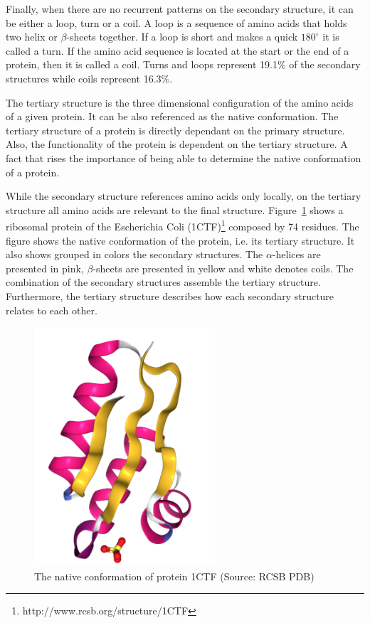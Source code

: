 Finally, when there are no recurrent patterns on the secondary structure, it can be either a loop, turn or a coil. A loop is a sequence of amino acids that holds two helix or $\beta$-sheets together. If a loop is short and makes a quick $180^\circ$ it is called a turn. If the amino acid sequence is located at the start or the end of a protein, then it is called a coil. Turns and loops represent 19.1\% of the secondary structures while coils represent 16.3\%.

The tertiary structure is the three dimensional configuration of the amino acids of a given protein. It can be also referenced as the native conformation. The tertiary structure of a protein is directly dependant on the primary structure. Also, the functionality of the protein is dependent on the tertiary structure. A fact that rises the importance of being able to determine the native conformation of a protein.

While the secondary structure references amino acids only locally, on the tertiary structure all amino acids are relevant to the final structure.
Figure~\ref{fig:1ctf} shows a ribosomal protein of the Escherichia Coli (1CTF)\footnote{http://www.rcsb.org/structure/1CTF} composed by 74 residues.
The figure shows the native conformation of the protein, i.e. its tertiary structure. It also shows grouped in colors the secondary structures. The $\alpha$-helices are
presented in pink, $\beta$-sheets are presented in yellow and white denotes
coils. The combination of the secondary structures assemble the tertiary structure. Furthermore, the tertiary structure describes how each secondary structure relates to each other.

\begin{figure}[htbp]
    \centering
    \includegraphics[angle=90,origin=c,width=0.6\textwidth]{Figuras/1ctf.png}
    \caption{The native conformation of protein 1CTF (Source: RCSB PDB)}
    \label{fig:1ctf}
\end{figure}

